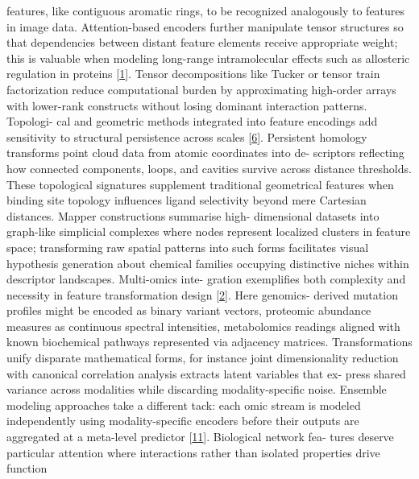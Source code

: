 \documentclass[
]{article}
\begin{document}
features, like contiguous aromatic rings, to be recognized analogously
to features in image data. Attention-based encoders further manipulate
tensor structures so that dependencies between distant feature elements
receive appropriate weight; this is valuable when modeling long-range
intramolecular effects such as allosteric regulation in proteins
{[}\protect\hyperlink{_bookmark41}{1}{]}. Tensor decompositions like
Tucker or tensor train factorization reduce computational burden by
approximating high-order arrays with lower-rank constructs without
losing dominant interaction patterns. Topologi- cal and geometric
methods integrated into feature encodings add sensitivity to structural
persistence across scales {[}\protect\hyperlink{_bookmark46}{6}{]}.
Persistent homology transforms point cloud data from atomic coordinates
into de- scriptors reflecting how connected components, loops, and
cavities survive across distance thresholds. These topological
signatures supplement traditional geometrical features when binding site
topology influences ligand selectivity beyond mere Cartesian distances.
Mapper constructions summarise high- dimensional datasets into
graph-like simplicial complexes where nodes represent localized clusters
in feature space; transforming raw spatial patterns into such forms
facilitates visual hypothesis generation about chemical families
occupying distinctive niches within descriptor landscapes. Multi-omics
inte- gration exemplifies both complexity and necessity in feature
transformation design {[}\protect\hyperlink{_bookmark42}{2}{]}. Here
genomics- derived mutation profiles might be encoded as binary variant
vectors, proteomic abundance measures as continuous spectral
intensities, metabolomics readings aligned with known biochemical
pathways represented via adjacency matrices. Transformations unify
disparate mathematical forms, for instance joint dimensionality
reduction with canonical correlation analysis extracts latent variables
that ex- press shared variance across modalities while discarding
modality-specific noise. Ensemble modeling approaches take a different
tack: each omic stream is modeled independently using modality-specific
encoders before their outputs are aggregated at a meta-level predictor
{[}\protect\hyperlink{_bookmark51}{11}{]}. Biological network fea- tures
deserve particular attention where interactions rather than isolated
properties drive function
\end{document}
